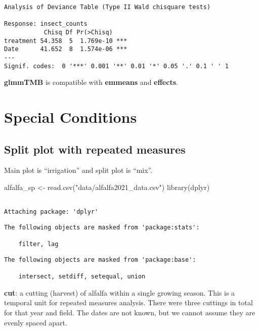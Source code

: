 \documentclass[
  letterpaper,
  DIV=11,
  numbers=noendperiod]{scrreprt}
\newenvironment{Shaded}{\begin{snugshade}}{\end{snugshade}}
\newcommand{\FunctionTok}[1]{\textcolor[rgb]{0.28,0.35,0.67}{#1}}
\newcommand{\NormalTok}[1]{\textcolor[rgb]{0.00,0.23,0.31}{#1}}
\newcommand{\OtherTok}[1]{\textcolor[rgb]{0.00,0.23,0.31}{#1}}
\newcommand{\StringTok}[1]{\textcolor[rgb]{0.13,0.47,0.30}{#1}}
\begin{document}
\begin{verbatim}
Analysis of Deviance Table (Type II Wald chisquare tests)

Response: insect_counts
           Chisq Df Pr(>Chisq)    
treatment 54.358  5  1.769e-10 ***
Date      41.652  8  1.574e-06 ***
---
Signif. codes:  0 '***' 0.001 '**' 0.01 '*' 0.05 '.' 0.1 ' ' 1
\end{verbatim}

\textbf{glmmTMB} is compatible with \textbf{emmeans} and
\textbf{effects}.


\hypertarget{special-conditions}{%
\chapter{Special Conditions}\label{special-conditions}}

\hypertarget{split-plot-with-repeated-measures}{%
\section{Split plot with repeated
measures}\label{split-plot-with-repeated-measures}}

Main plot is ``irrigation'' and split plot is ``mix''.

\begin{Shaded}
\begin{Highlighting}[]
\NormalTok{alfalfa\_sp }\OtherTok{\textless{}{-}} \FunctionTok{read.csv}\NormalTok{(}\StringTok{"data/alfalfa2021\_data.csv"}\NormalTok{)}
\FunctionTok{library}\NormalTok{(dplyr)}
\end{Highlighting}
\end{Shaded}

\begin{verbatim}

Attaching package: 'dplyr'
\end{verbatim}

\begin{verbatim}
The following objects are masked from 'package:stats':

    filter, lag
\end{verbatim}

\begin{verbatim}
The following objects are masked from 'package:base':

    intersect, setdiff, setequal, union
\end{verbatim}

\textbf{cut}: a cutting (harvest) of alfalfa within a single growing
season. This is a temporal unit for repeated measures analysis. There
were three cuttings in total for that year and field. The dates are not
known, but we cannot assume they are evenly spaced apart.
\end{document}
